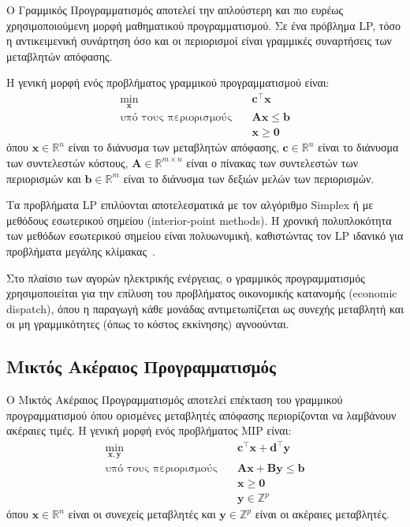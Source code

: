 Ο Γραμμικός Προγραμματισμός αποτελεί την απλούστερη και πιο ευρέως χρησιμοποιούμενη μορφή μαθηματικού προγραμματισμού. Σε ένα πρόβλημα LP, τόσο η αντικειμενική συνάρτηση όσο και οι περιορισμοί είναι γραμμικές συναρτήσεις των μεταβλητών απόφασης.

Η γενική μορφή ενός προβλήματος γραμμικού προγραμματισμού είναι:
\begin{equation}
\label{eq:lp-general}
\begin{aligned}
\min_{\mathbf{x}} \quad & \mathbf{c}^\top \mathbf{x} \\
\text{υπό τους περιορισμούς} \quad & \mathbf{A}\mathbf{x} \leq \mathbf{b} \\
& \mathbf{x} \geq \mathbf{0}
\end{aligned}
\end{equation}
όπου $\mathbf{x} \in \mathbb{R}^n$ είναι το διάνυσμα των μεταβλητών απόφασης, $\mathbf{c} \in \mathbb{R}^n$ είναι το διάνυσμα των συντελεστών κόστους, $\mathbf{A} \in \mathbb{R}^{m \times n}$ είναι ο πίνακας των συντελεστών των περιορισμών και $\mathbf{b} \in \mathbb{R}^m$ είναι το διάνυσμα των δεξιών μελών των περιορισμών.

Τα προβλήματα LP επιλύονται αποτελεσματικά με τον αλγόριθμο Simplex ή με μεθόδους εσωτερικού σημείου (interior-point methods). Η χρονική πολυπλοκότητα των μεθόδων εσωτερικού σημείου είναι πολυωνυμική, καθιστώντας τον LP ιδανικό για προβλήματα μεγάλης κλίμακας~\cite{bertsimas-tsitsiklis1997}.

Στο πλαίσιο των αγορών ηλεκτρικής ενέργειας, ο γραμμικός προγραμματισμός χρησιμοποιείται για την επίλυση του προβλήματος οικονομικής κατανομής (economic dispatch), όπου η παραγωγή κάθε μονάδας αντιμετωπίζεται ως συνεχής μεταβλητή και οι μη γραμμικότητες (όπως το κόστος εκκίνησης) αγνοούνται.

\subsection{Μικτός Ακέραιος Προγραμματισμός}
\label{subsec:mixed-integer-programming}

Ο Μικτός Ακέραιος Προγραμματισμός αποτελεί επέκταση του γραμμικού προγραμματισμού όπου ορισμένες μεταβλητές απόφασης περιορίζονται να λαμβάνουν ακέραιες τιμές. Η γενική μορφή ενός προβλήματος MIP είναι:
\begin{equation}
\label{eq:mip-general}
\begin{aligned}
\min_{\mathbf{x}, \mathbf{y}} \quad & \mathbf{c}^\top \mathbf{x} + \mathbf{d}^\top \mathbf{y} \\
\text{υπό τους περιορισμούς} \quad & \mathbf{A}\mathbf{x} + \mathbf{B}\mathbf{y} \leq \mathbf{b} \\
& \mathbf{x} \geq \mathbf{0} \\
& \mathbf{y} \in \mathbb{Z}^p
\end{aligned}
\end{equation}
όπου $\mathbf{x} \in \mathbb{R}^n$ είναι οι συνεχείς μεταβλητές και $\mathbf{y} \in \mathbb{Z}^p$ είναι οι ακέραιες μεταβλητές.

